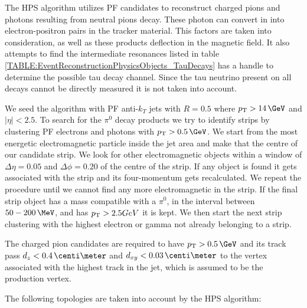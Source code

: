 
The \gls{HPS} algorithm utilizes \gls{PF} candidates to reconstruct charged pions and photons resulting from neutral pions decay. These photon can convert in into electron-positron pairs in the tracker material. This factors are taken into consideration, as well as these products deflection in the magnetic field. It also attempts to find the intermediate resonances listed in table \ref{TABLE:EventReconstructionPhysicsObjects_TauDecays} has a handle to determine the possible tau decay channel. Since the tau neutrino present on all decays cannot be directly measured it is not taken into account.


We seed the algorithm with \gls{PF} anti-$k_T$ jets with $R = 0.5$ where $\pt>14\,\GeV$ and $|\eta|<2.5$. To search for the $\pi^{0}$ decay products we try to identify strips by clustering \gls{PF} electrons and photons with $\pt>0.5\,\GeV$. We start from the most energetic electromagnetic particle inside the jet area and make that the centre of our candidate strip. We look for other electromagnetic objects within a window of $\Delta\eta = 0.05$ and $\Delta\phi = 0.20$ of the centre of the strip. If any object is found it gets associated with the strip and its four-momentum gets recalculated. We repeat the procedure until we cannot find any more electromagnetic in the strip. If the final strip object has a mass compatible with a $\pi^{0}$, in the interval between $50-200\,\MeV$, and has $p_{\mathrm{T}} > 2.5 GeV$ it is kept. We then start the next strip clustering with the highest \pt electron or gamma not already belonging to a strip.

The charged pion candidates are required to have $\pt > 0.5\,\GeV$ and its track pass $d_z < 0.4\,\centi\meter$ and $d_{xy} < 0.03\,\centi\meter$ to the vertex associated with the highest \pt track in the jet, which is assumed to be the \tau production vertex.

The following topologies are taken into account by the \gls{HPS} algorithm:


